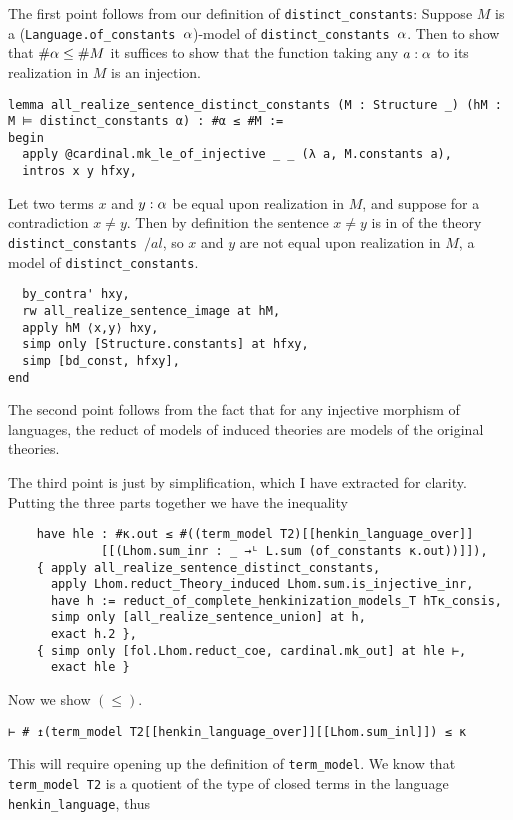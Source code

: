 The first point follows from our definition of \texttt{distinct\_constants}:
Suppose $M$ is a (\texttt{Language.of\_constants $\alpha$})-model of
\texttt{distinct\_constants $\alpha$}.
Then to show that $\# \alpha \le \# M$ it suffices to show that the function
taking any $a : \alpha$ to its realization in $M$ is an injection.
\begin{lstlisting}
lemma all_realize_sentence_distinct_constants (M : Structure _) (hM : M ⊨ distinct_constants α) : #α ≤ #M :=
begin
  apply @cardinal.mk_le_of_injective _ _ (λ a, M.constants a),
  intros x y hfxy, \end{lstlisting}
Let two terms $x$ and $y : \alpha$ be equal upon realization in $M$,
and suppose for a contradiction $x \ne y$.
Then by definition the sentence $x \ne y$ is in
of the theory \texttt{distinct\_constants $/al$}, so
$x$ and $y$ are not equal upon realization in $M$,
a model of \texttt{distinct\_constants}.
\begin{lstlisting}
  by_contra' hxy,
  rw all_realize_sentence_image at hM,
  apply hM ⟨x,y⟩ hxy,
  simp only [Structure.constants] at hfxy,
  simp [bd_const, hfxy],
end \end{lstlisting}

The second point follows from the fact that
for any injective morphism of languages,
the reduct of models of induced theories are models of the original theories.

The third point is just by simplification, which I have extracted for clarity.
Putting the three parts together we have the inequality
\begin{lstlisting}
    have hle : #κ.out ≤ #((term_model T2)[[henkin_language_over]]
             [[(Lhom.sum_inr : _ →ᴸ L.sum (of_constants κ.out))]]),
    { apply all_realize_sentence_distinct_constants,
      apply Lhom.reduct_Theory_induced Lhom.sum.is_injective_inr,
      have h := reduct_of_complete_henkinization_models_T hTκ_consis,
      simp only [all_realize_sentence_union] at h,
      exact h.2 },
    { simp only [fol.Lhom.reduct_coe, cardinal.mk_out] at hle ⊢,
      exact hle } \end{lstlisting}

Now we show $(\le)$.
\begin{lstlisting}
⊢ # ↥(term_model T2[[henkin_language_over]][[Lhom.sum_inl]]) ≤ κ \end{lstlisting}
This will require opening up the definition of \texttt{term\_model}.
We know that \texttt{term\_model T2} is a quotient of the type of closed
terms in the language \texttt{henkin\_language}, thus

